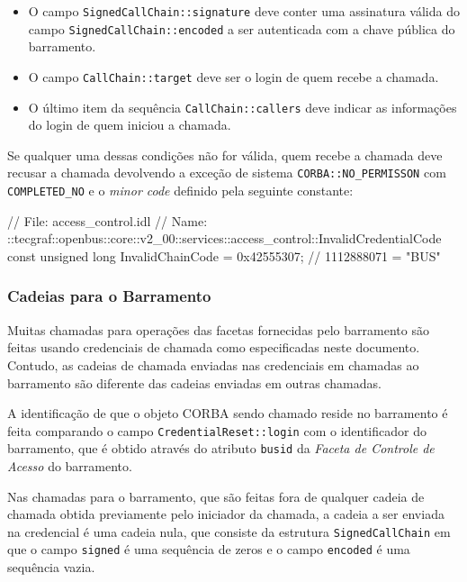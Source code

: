 \documentclass[]{article}
\newcommand{\term}[1]{\textit{#1}}
\newcommand{\code}[1]{\texttt{#1}}
\begin{document}
\begin{itemize}
		\item O campo \code{SignedCallChain::signature} deve conter uma assinatura válida do campo \code{SignedCallChain::encoded} a ser autenticada com a chave pública do barramento.
	\item O campo \code{CallChain::target} deve ser o login de quem recebe a chamada.
	\item O último item da sequência \code{CallChain::callers} deve indicar as informações do login de quem iniciou a chamada.
\end{itemize}

Se qualquer uma dessas condições não for válida, quem recebe a chamada deve recusar a chamada devolvendo a exceção de sistema \code{CORBA::NO\_PERMISSON} com \code{COMPLETED\_NO} e o \term{minor code} definido pela seguinte constante:

\begin{samplecode}[language={[CORBA]idl}]
// File: access_control.idl
// Name: ::tecgraf::openbus::core::v2_00::services::access_control::InvalidCredentialCode
const unsigned long InvalidChainCode = 0x42555307; // 1112888071 = "BUS\7"
\end{samplecode}


\subsubsection{Cadeias para o Barramento} %
\label{sub:cadeias_para_o_barramento}

Muitas chamadas para operações das facetas fornecidas pelo barramento são feitas usando credenciais de chamada como especificadas neste documento.
Contudo, as cadeias de chamada enviadas nas credenciais em chamadas ao barramento são diferente das cadeias enviadas em outras chamadas.

A identificação de que o objeto CORBA sendo chamado reside no barramento é feita comparando o campo \code{CredentialReset::login} com o identificador do barramento, que é obtido através do atributo \code{busid} da \term{Faceta de Controle de Acesso} do barramento.

Nas chamadas para o barramento, que são feitas fora de qualquer cadeia de chamada obtida previamente pelo iniciador da chamada, a cadeia a ser enviada na credencial é uma cadeia nula, que consiste da estrutura \code{SignedCallChain} em que o campo \code{signed} é uma sequência de zeros e o campo \code{encoded} é uma sequência vazia.
\end{document}
